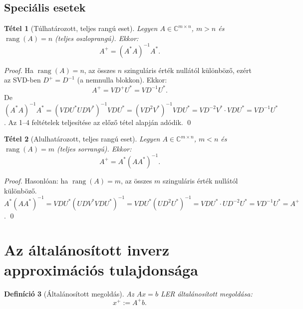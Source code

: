 \documentclass[a4paper,12pt]{article}
\theoremstyle{mydef}
\newtheorem{tetel}{Tétel}[section]
\newtheorem{definicio}[tetel]{Definíció}
\newcommand{\C}{\mathbb{C}}
\DeclareMathOperator{\rang}{rang}
\begin{document}
\subsection*{Speciális esetek}

\begin{mdframed}[backgroundcolor=thmbg,linewidth=0pt,innertopmargin=8pt,innerbottommargin=8pt]
\begin{tetel}[Túlhatározott, teljes rangú eset]
\label{tetel:tulhatarozottPS}
Legyen $A \in \C^{m\times n}$, $m > n$ és $\rang(A) = n$ (teljes oszloprangú). Ekkor:
\[
  A^+ = (A^*A)^{-1}A^*.
\]
\end{tetel}
\end{mdframed}

\begin{proof}
Ha $\rang(A) = n$, az összes $n$ szinguláris érték nullától különböző, ezért az SVD-ben
$D^+ = D^{-1}$ (a nemnulla blokkon). Ekkor:
\[
  A^+ = VD^+U^* = VD^{-1}U^*.
\]
De $(A^*A)^{-1}A^* = (VDU^*UDV^*)^{-1}VDU^* = (VD^2V^*)^{-1}VDU^* = VD^{-2}V^*\cdot VDU^* = VD^{-1}U^*$.
Az 1--4 feltételek teljesítése az előző tétel alapján adódik. \qed
\end{proof}

\begin{mdframed}[backgroundcolor=thmbg,linewidth=0pt,innertopmargin=8pt,innerbottommargin=8pt]
\begin{tetel}[Alulhatározott, teljes rangú eset]
\label{tetel:alulhatarozottPS}
Legyen $A \in \C^{m\times n}$, $m < n$ és $\rang(A) = m$ (teljes sorrangú). Ekkor:
\[
  A^+ = A^*(AA^*)^{-1}.
\]
\end{tetel}
\end{mdframed}

\begin{proof}
Hasonlóan: ha $\rang(A) = m$, az összes $m$ szinguláris érték nullától különböző.
$A^*(AA^*)^{-1} = VDU^*(UDV^*VDU^*)^{-1} = VDU^*(UD^2U^*)^{-1} = VDU^*\cdot UD^{-2}U^* = VD^{-1}U^* = A^+$. \qed
\end{proof}

\section{Az általánosított inverz approximációs tulajdonsága}
\label{sec:approx}

\begin{mdframed}[backgroundcolor=defbg,linewidth=0pt,innertopmargin=8pt,innerbottommargin=8pt]
\begin{definicio}[Általánosított megoldás]
Az $Ax = b$ LER általánosított megoldása:
\[
  x^+ := A^+ b.
\]
\end{definicio}
\end{mdframed}
\end{document}
